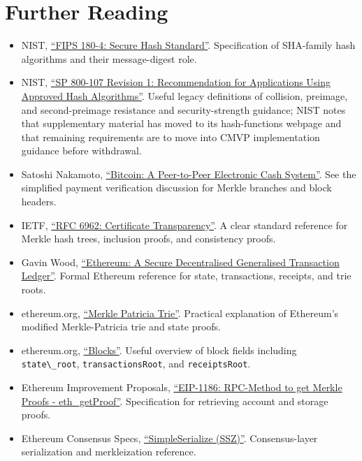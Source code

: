 \section{Further Reading}

\begin{itemize}
\tightlist
\item
  NIST,
  \href{https://nvlpubs.nist.gov/nistpubs/FIPS/NIST.FIPS.180-4.pdf}{``FIPS
  180-4: Secure Hash Standard''}. Specification of SHA-family hash
  algorithms and their message-digest role.
\item
  NIST,
  \href{https://nvlpubs.nist.gov/nistpubs/Legacy/SP/nistspecialpublication800-107r1.pdf}{``SP
  800-107 Revision 1: Recommendation for Applications Using Approved
  Hash Algorithms''}. Useful legacy definitions of collision, preimage,
  and second-preimage resistance and security-strength guidance; NIST
  notes that supplementary material has moved to its hash-functions
  webpage and that remaining requirements are to move into CMVP
  implementation guidance before withdrawal.
\item
  Satoshi Nakamoto, \href{https://bitcoin.org/bitcoin.pdf}{``Bitcoin: A
  Peer-to-Peer Electronic Cash System''}. See the simplified payment
  verification discussion for Merkle branches and block headers.
\item
  IETF, \href{https://datatracker.ietf.org/doc/html/rfc6962}{``RFC 6962:
  Certificate Transparency''}. A clear standard reference for Merkle
  hash trees, inclusion proofs, and consistency proofs.
\item
  Gavin Wood,
  \href{https://ethereum.github.io/yellowpaper/paper.pdf}{``Ethereum: A
  Secure Decentralised Generalised Transaction Ledger''}. Formal
  Ethereum reference for state, transactions, receipts, and trie roots.
\item
  ethereum.org,
  \href{https://ethereum.org/developers/docs/data-structures-and-encoding/patricia-merkle-trie/}{``Merkle
  Patricia Trie''}. Practical explanation of Ethereum's modified
  Merkle-Patricia trie and state proofs.
\item
  ethereum.org,
  \href{https://ethereum.org/developers/docs/blocks/}{``Blocks''}.
  Useful overview of block fields including
  \passthrough{\lstinline!state\_root!},
  \passthrough{\lstinline!transactionsRoot!}, and
  \passthrough{\lstinline!receiptsRoot!}.
\item
  Ethereum Improvement Proposals,
  \href{https://eips.ethereum.org/EIPS/eip-1186}{``EIP-1186: RPC-Method
  to get Merkle Proofs - eth\_getProof''}. Specification for retrieving
  account and storage proofs.
\item
  Ethereum Consensus Specs,
  \href{https://ethereum.github.io/consensus-specs/ssz/simple-serialize/}{``SimpleSerialize
  (SSZ)''}. Consensus-layer serialization and merkleization reference.
\end{itemize}

